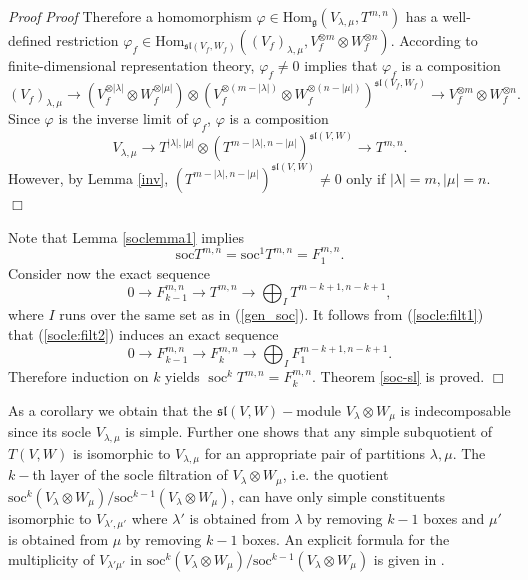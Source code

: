\documentclass{svmult}
\renewenvironment{proof}{ \emph{Proof}}{$\Box$}
\renewcommand{\sl}{\mathfrak{sl}}
\renewcommand{\gg}{\mathfrak{g}}
\renewcommand {\phi} {\varphi}
\newcommand{\Hom}{\mathrm{Hom}}
\begin{document}
\begin{proof}
\begin{proof}
Therefore a homomorphism $\varphi\in\Hom_\gg(V_{\lambda,\mu}, T^{m,n})$ has a well-defined restriction $\varphi_f\in \Hom_{\sl(V_f,W_f)}((V_f)_{\lambda,\mu},V_f^{\otimes m}\otimes W_f^{\otimes n})$. According to finite-dimensional representation theory, $\phi_f\neq 0$ implies that $\varphi_f$ is a composition 
$$(V_f)_{\lambda,\mu}\to (V_f^{\otimes|\lambda|} \otimes W_f^{\otimes|\mu|})\otimes(V_f^{\otimes(m-|\lambda|)}\otimes W_f^{\otimes(n-|\mu|)})^{\sl(V_f,W_f)}\xrightarrow{} V_f^{\otimes m}\otimes W_f^{\otimes n}.$$ 
Since $\varphi$ is the inverse limit of $\varphi_f$, $\varphi$ is a composition 
$$V_{\lambda,\mu} \to T^{|\lambda|,|\mu|}\otimes  (T^{m-|\lambda|,n-|\mu|})^{\sl(V,W)}\xrightarrow{} T^{m,n}.$$ 
However, by Lemma \ref{inv}, $(T^{m-|\lambda|,n-|\mu|})^{\sl(V,W)}\neq 0$ only if  $|\lambda|=m,|\mu|=n$.
\end{proof}

Note that Lemma \ref{soclemma1} implies 
\begin{equation}\label{socle:filt1}
 \mathrm{soc}T^{m,n}=\mathrm{soc}^1T^{m,n}=F_1^{m,n}.
\end{equation}
Consider now the exact sequence
\begin{equation}\label{socle:filt2}
 0\to F^{m,n}_{k-1}\to T^{m,n}\to \bigoplus_I T^{m-k+1,n-k+1},
\end{equation}
where $I$ runs over the same set as in (\ref{gen_soc}).
It follows from (\ref{socle:filt1}) that (\ref{socle:filt2}) induces an exact sequence
$$0\to F^{m,n}_{k-1}\to F^{m,n}_{k}\to \bigoplus_I F^{m-k+1,n-k+1}_1.$$
Therefore induction on $k$ yields $\operatorname{soc}^{k}T^{m,n}=F^{m,n}_{k}$.
Theorem \ref{soc-sl} is proved.
\end{proof}

As a corollary we obtain that the $\sl(V,W)-$module $V_{\lambda}
\otimes W_{\mu}$ is indecomposable since its socle 
$V_{\lambda,\mu}$ is simple. Further one shows that any simple
subquotient of $T(V,W)$ is isomorphic to 
$V_{\lambda,\mu}$ for an appropriate pair of partitions $\lambda,
\mu.$ The $k-$th layer of the socle filtration of $V_{\lambda} \otimes W_\mu$, i.e. the quotient $\mathrm{soc}^k(V_{\lambda} \otimes W_\mu)/\mathrm{soc}^{k-1}(V_{\lambda}\otimes W_\mu)$, can 
have only simple constituents isomorphic to $V_{\lambda',\mu'}$ where $\lambda'$ is obtained from $\lambda$ by removing $k-1$ boxes and $\mu'$ is obtained from $\mu$ by removing $k-1$ boxes. An explicit formula for the multiplicity of $V_{\lambda' \mu'}$ in  $\mathrm{soc}^k(V_{\lambda} \otimes W_{\mu})/\mathrm{soc}^{k-1}(V_{\lambda}\otimes W_\mu)$ is given in \cite{pstyr}.
\end{document}
